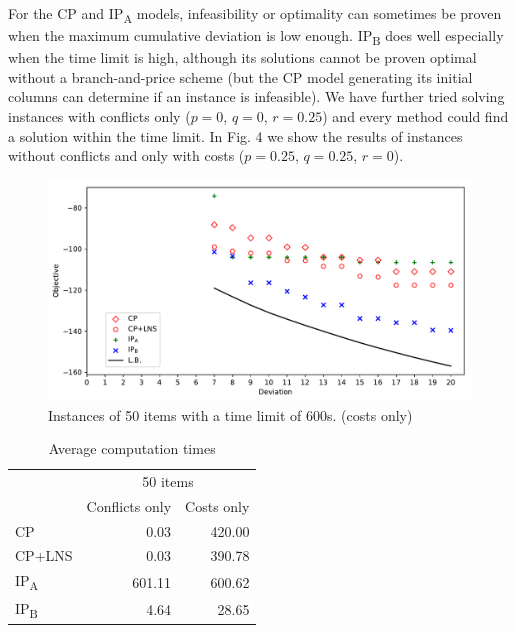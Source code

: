 \documentclass{llncs}
\begin{document}
For the CP and IP\textsubscript{A} models, infeasibility or optimality can sometimes be proven when the maximum cumulative deviation is low enough. IP\textsubscript{B} does well especially when the time limit is high, although its solutions cannot be proven optimal without a branch-and-price scheme (but the CP model generating its initial columns can determine if an instance is infeasible). We have further tried solving instances with conflicts only ($p=0$, $q=0$, $r=0.25$) and every method could find a solution within the time limit. In Fig. 4 we show the results of instances without conflicts and only with costs ($p=0.25$, $q=0.25$, $r=0$).

\begin{figure}[H]
  \begin{center}
    \caption[]{Instances of 50 items with a time limit of 600s. (costs only)}
    \includegraphics[scale=0.52]{cost50d-norm1-tl600.pdf}
  \end{center}
\end{figure}

\begin{table}[H]
  \centering
  \setlength{\tabcolsep}{8pt}
\caption{Average computation times}
\begin{tabular}{lrr}
  \cline{2-3}\noalign{\smallskip}
  & \multicolumn{2}{c}{50 items} \\
  \cline{2-3}\noalign{\smallskip}
& Conflicts only & Costs only \\
\noalign{\smallskip}
\hline
\noalign{\smallskip}
CP    & 0.03 & 420.00 \\
CP+LNS & 0.03 & 390.78 \\
IP\textsubscript{A} & 601.11 & 600.62 \\
IP\textsubscript{B} & 4.64 & 28.65 \\
\hline
\end{tabular}
\end{table}
\end{document}
